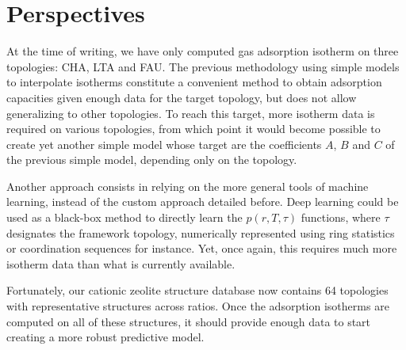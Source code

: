 \documentclass[main.tex]{subfiles}
\begin{document}
\section{Perspectives}

At the time of writing, we have only computed gas adsorption isotherm on three topologies: CHA, LTA and FAU. The previous methodology using simple models to interpolate isotherms constitute a convenient method to obtain adsorption capacities given enough data for the target topology, but does not allow generalizing to other topologies. To reach this target, more isotherm data is required on various topologies, from which point it would become possible to create yet another simple model whose target are the coefficients $A$, $B$ and $C$ of the previous simple model, depending only on the topology.

Another approach consists in relying on the more general tools of machine learning, instead of the custom approach detailed before. Deep learning could be used as a black-box method to directly learn the $p(r, T, \tau)$ functions, where $\tau$ designates the framework topology, numerically represented using ring statistics or coordination sequences for instance. Yet, once again, this requires much more isotherm data than what is currently available.

Fortunately, our cationic zeolite structure database now contains 64 topologies with representative structures across \SiAl ratios. Once the adsorption isotherms are computed on all of these structures, it should provide enough data to start creating a more robust predictive model.
\end{document}
